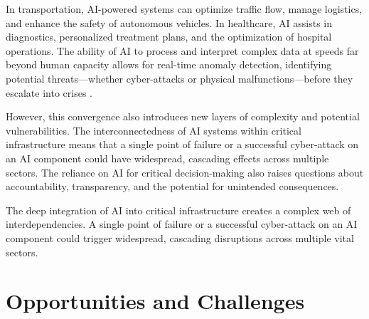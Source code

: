In transportation, AI-powered systems can optimize traffic flow, manage logistics, and enhance the safety of autonomous vehicles. In healthcare, AI assists in diagnostics, personalized treatment plans, and the optimization of hospital operations. The ability of AI to process and interpret complex data at speeds far beyond human capacity allows for real-time anomaly detection, identifying potential threats—whether cyber-attacks or physical malfunctions—before they escalate into crises \parencite{TechNextCon2023}.

However, this convergence also introduces new layers of complexity and potential vulnerabilities. The interconnectedness of AI systems within critical infrastructure means that a single point of failure or a successful cyber-attack on an AI component could have widespread, cascading effects across multiple sectors. The reliance on AI for critical decision-making also raises questions about accountability, transparency, and the potential for unintended consequences.

\begin{warningbox}
The deep integration of AI into critical infrastructure creates a complex web of interdependencies. A single point of failure or a successful cyber-attack on an AI component could trigger widespread, cascading disruptions across multiple vital sectors.
\end{warningbox}

\section{Opportunities and Challenges}
\label{sec:opportunities_and_challenges}

